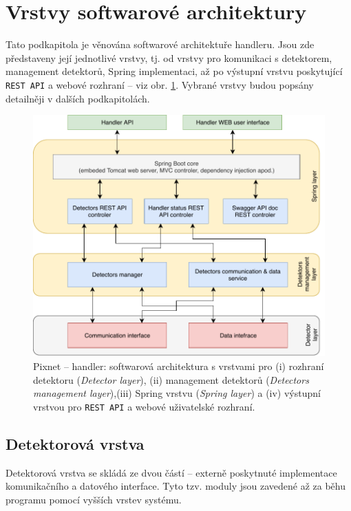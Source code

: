 \section{Vrstvy softwarové architektury}\label{chap:handler:architecture}
Tato podkapitola je věnována softwarové architektuře handleru. Jsou zde představeny její jednotlivé vrstvy, tj. od vrstvy pro komunikaci s detektorem, management detektorů, Spring implementaci, až po výstupní vrstvu poskytující \texttt{REST API} a webové rozhraní -- viz obr. \ref{fig:handler:arch}. Vybrané vrstvy budou popsány detailněji v dalších podkapitolách.

\begin{figure}[th]
	\begin{center}
		\vspace*{0.4cm}
		\includegraphics[width=14cm]{figures/handler_architecture.pdf}
		\caption{Pixnet -- handler: softwarová architektura s vrstvami pro (i) rozhraní detektoru (\textit{Detector layer}), (ii) management detektorů (\textit{Detectors management layer}),(iii) Spring vrstvu (\textit{Spring layer}) a (iv) výstupní vrstvou pro \texttt{REST API} a webové uživatelské rozhraní.}
		\label{fig:handler:arch}
	\end{center}
\end{figure}

\subsection{Detektorová vrstva}\label{chap:handler:detector_layer}
Detektorová vrstva se skládá ze dvou částí -- externě poskytnuté implementace komunikačního a datového interface. Tyto tzv. moduly jsou zavedené až za běhu programu pomocí vyšších vrstev systému.


